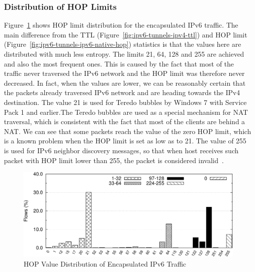 \subsubsection{Distribution of HOP Limits}
Figure~\ref{fig:ipv6-tunnels-tunnels-hop} shows HOP limit distribution for the encapsulated IPv6 traffic. The main difference from the TTL (Figure~\ref{fig:ipv6-tunnels-ipv4-ttl}) and HOP limit (Figure~\ref{fig:ipv6-tunnels-ipv6-native-hop}) statistics is that the values here are distributed with much less entropy. The limits 21, 64, 128 and 255 are achieved and also the most frequent ones. This is caused by the fact that most of the traffic never traversed the IPv6 network and the HOP limit was therefore never decreased. In fact, when the values are lower, we can be reasonably certain that the packets already traversed IPv6 network and are heading towards the IPv4 destination. The value 21 is used for Teredo bubbles by Windows 7 with Service Pack 1 and earlier.The Teredo bubbles are used as a special mechanism for NAT traversal, which is consistent with the fact that most of the clients are behind a NAT. We can see that some packets reach the value of the zero HOP limit, which is a known problem when the HOP limit is set as low as to 21. The value of 255 is used for IPv6 neighbor discovery messages, so that when host receives such packet with HOP limit lower than 255, the packet is considered invalid~\cite{rfc4861}.

\begin{figure}[!tb]
        \centering
        \includegraphics[width=1.00\linewidth]{figures/paper-tunnels/ttl/hop}
        \caption{HOP Value Distribution of Encapsulated IPv6 Traffic}
        \label{fig:ipv6-tunnels-tunnels-hop}
\end{figure}

